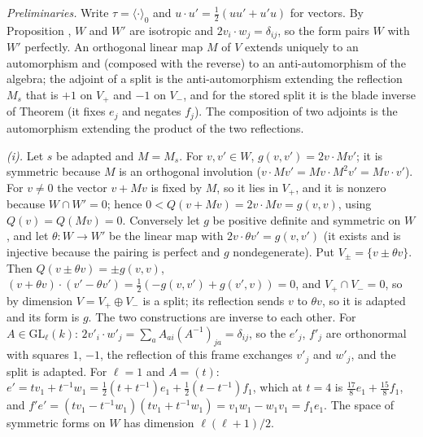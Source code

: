 \emph{Preliminaries.} Write $\tau = \langle\cdot\rangle_{0}$ and $u \cdot u' = \tfrac12(uu' + u'u)$ for vectors. By Proposition , $W$ and $W'$ are isotropic and $2v_{i} \cdot w_{j} = \delta_{ij}$, so the form pairs $W$ with $W'$ perfectly. An orthogonal linear map $M$ of $V$ extends uniquely to an automorphism and (composed with the reverse) to an anti-automorphism of the algebra; the adjoint of a split is the anti-automorphism extending the reflection $M_{s}$ that is $+1$ on $V_{+}$ and $-1$ on $V_{-}$, and for the stored split it is the blade inverse of Theorem  (it fixes $e_{j}$ and negates $f_{j}$). The composition of two adjoints is the automorphism extending the product of the two reflections.

\emph{(i).} Let $s$ be adapted and $M = M_{s}$. For $v, v' \in W$, $g(v,v') = 2v \cdot Mv'$; it is symmetric because $M$ is an orthogonal involution ($v \cdot Mv' = Mv \cdot M^{2}v' = Mv \cdot v'$). For $v \ne 0$ the vector $v + Mv$ is fixed by $M$, so it lies in $V_{+}$, and it is nonzero because $W \cap W' = 0$; hence $0 < Q(v + Mv) = 2v \cdot Mv = g(v,v)$, using $Q(v) = Q(Mv) = 0$. Conversely let $g$ be positive definite and symmetric on $W$, and let $\theta : W \to W'$ be the linear map with $2v \cdot \theta v' = g(v,v')$ (it exists and is injective because the pairing is perfect and $g$ nondegenerate). Put $V_{\pm} = \{v \pm \theta v\}$. Then $Q(v \pm \theta v) = \pm g(v,v)$, $(v + \theta v) \cdot (v' - \theta v') = \tfrac12(-g(v,v') + g(v',v)) = 0$, and $V_{+} \cap V_{-} = 0$, so by dimension $V = V_{+} \oplus V_{-}$ is a split; its reflection sends $v$ to $\theta v$, so it is adapted and its form is $g$. The two constructions are inverse to each other. For $A \in \mathrm{GL}_{\ell}(k)$: $2v'_{i} \cdot w'_{j} = \sum_{a}A_{ai}(A^{-1})_{ja} = \delta_{ij}$, so the $e'_{j}$, $f'_{j}$ are orthonormal with squares $1$, $-1$, the reflection of this frame exchanges $v'_{j}$ and $w'_{j}$, and the split is adapted. For $\ell = 1$ and $A = (t)$: $e' = tv_{1} + t^{-1}w_{1} = \tfrac12(t + t^{-1})e_{1} + \tfrac12(t - t^{-1})f_{1}$, which at $t = 4$ is $\tfrac{17}{8}e_{1} + \tfrac{15}{8}f_{1}$, and $f'e' = (tv_{1} - t^{-1}w_{1})(tv_{1} + t^{-1}w_{1}) = v_{1}w_{1} - w_{1}v_{1} = f_{1}e_{1}$. The space of symmetric forms on $W$ has dimension $\ell(\ell+1)/2$.

